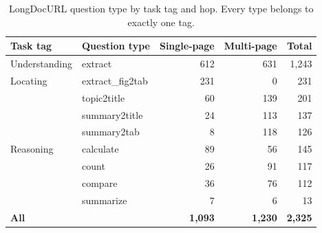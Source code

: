 \begin{table}[h]
\centering
\small
\begin{tabular}{llrrr}
\toprule
Task tag & Question type & Single-page & Multi-page & Total \\
\midrule
Understanding & extract          & 612 & 631 & 1,243 \\
\midrule
Locating & extract\_fig2tab      & 231 & 0   & 231 \\
         & topic2title           & 60  & 139 & 201 \\
         & summary2title         & 24  & 113 & 137 \\
         & summary2tab           & 8   & 118 & 126 \\
\midrule
Reasoning & calculate            & 89  & 56  & 145 \\
          & count                & 26  & 91  & 117 \\
          & compare              & 36  & 76  & 112 \\
          & summarize            & 7   & 6   & 13 \\
\midrule
\textbf{All} & & \textbf{1,093} & \textbf{1,230} & \textbf{2,325} \\
\bottomrule
\end{tabular}
\caption{LongDocURL question type by task tag and hop. Every type belongs to exactly one tag.}
\label{tab:ldu_tasks}
\end{table}